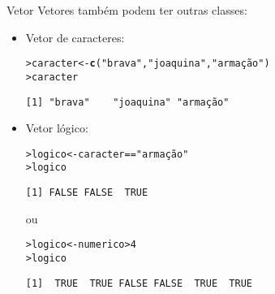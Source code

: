 \documentclass[10pt,handout]{beamer}\usepackage{graphicx, color}
\makeatletter
\newcommand{\hlfunctioncall}[1]{\textcolor[rgb]{0,0,0.545098039215686}{\textbf{#1}}}%
\newcommand{\hlstring}[1]{\textcolor[rgb]{0.282352941176471,0.23921568627451,0.545098039215686}{#1}}%
\newenvironment{kframe}{%
 \def\at@end@of@kframe{}%
 \ifinner\ifhmode%
  \def\at@end@of@kframe{\end{minipage}}%
  \begin{minipage}{\columnwidth}%
 \fi\fi%
 \def\FrameCommand##1{\hskip\@totalleftmargin \hskip-\fboxsep
 \colorbox{shadecolor}{##1}\hskip-\fboxsep
     \hskip-\linewidth \hskip-\@totalleftmargin \hskip\columnwidth}%
 \MakeFramed {\advance\hsize-\width
   \@totalleftmargin\z@ \linewidth\hsize
   \@setminipage}}%
 {\par\unskip\endMakeFramed%
 \at@end@of@kframe}
\newenvironment{knitrout}{}{} %
\makeatother
\begin{document}
\begin{frame}[fragile=singleslide]{Vetor}
Vetores também podem ter outras classes:
\begin{itemize}
\item Vetor de caracteres:
\begin{knitrout}\small
{}\color{fgcolor}\begin{kframe}
\begin{alltt}
> caracter <- \hlfunctioncall{c}(\hlstring{"brava"}, \hlstring{"joaquina"}, \hlstring{"armação"})
> caracter
\end{alltt}
\begin{verbatim}
[1] "brava"    "joaquina" "armação" 
\end{verbatim}
\end{kframe}
\end{knitrout}

\item Vetor lógico:
\begin{knitrout}\small
{}\color{fgcolor}\begin{kframe}
\begin{alltt}
> logico <- caracter == \hlstring{"armação"}
> logico
\end{alltt}
\begin{verbatim}
[1] FALSE FALSE  TRUE
\end{verbatim}
\end{kframe}
\end{knitrout}

ou
\begin{knitrout}\small
{}\color{fgcolor}\begin{kframe}
\begin{alltt}
> logico <- numerico > 4
> logico
\end{alltt}
\begin{verbatim}
[1]  TRUE  TRUE FALSE FALSE  TRUE  TRUE
\end{verbatim}
\end{kframe}
\end{knitrout}

\end{itemize}
\end{frame}
\end{document}
